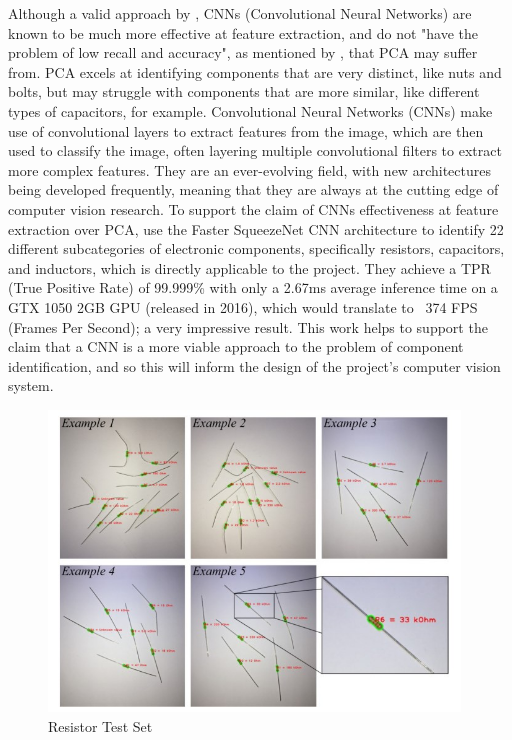 Although a valid approach by \citet{Dhenge2013MechanicalNS}, CNNs (Convolutional Neural Networks) are known to be much more effective at feature extraction, and do not "have the problem of low recall and accuracy", as mentioned by \citet{Xu2020}, that PCA may suffer from. PCA excels at identifying components that are very distinct, like nuts and bolts, but may struggle with components that are more similar, like different types of capacitors, for example. Convolutional Neural Networks (CNNs) make use of convolutional layers to extract features from the image, which are then used to classify the image, often layering multiple convolutional filters to extract more complex features. They are an ever-evolving field, with new architectures being developed frequently, meaning that they are always at the cutting edge of computer vision research. To support the claim of CNNs effectiveness at feature extraction over PCA, \citet{Xu2020} use the Faster SqueezeNet CNN architecture to identify 22 different subcategories of electronic components, specifically resistors, capacitors, and inductors, which is directly applicable to the project. They achieve a TPR (True Positive Rate) of 99.999\% with only a 2.67ms average inference time on a GTX 1050 2GB GPU (released in 2016), which would translate to ~374 FPS (Frames Per Second); a very impressive result. This work helps to support the claim that a CNN is a more viable approach to the problem of component identification, and so this will inform the design of the project's computer vision system.

\begin{figure}[H]
  \hfill
  \begin{minipage}[t]{\textwidth}
    \centering
    \includegraphics[height=8cm]{imgs/articles/resistordata.jpg}
    \caption{Resistor Test Set \citet{8939034}}
    \label{fig:resistordata}
  \end{minipage}
\end{figure}

